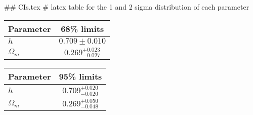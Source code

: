 ## CIs.tex
# latex table for the 1 and 2 sigma distribution of each parameter

\begin{tabular} { l  c}
 Parameter &  68\% limits\\
\hline
{\boldmath$h              $} & $0.709\pm 0.010            $\\
{\boldmath$\Omega_m       $} & $0.269^{+0.023}_{-0.027}   $\\
\hline
\end{tabular}

\begin{tabular} { l  c}
 Parameter &  95\% limits\\
\hline
{\boldmath$h              $} & $0.709^{+0.020}_{-0.020}   $\\
{\boldmath$\Omega_m       $} & $0.269^{+0.050}_{-0.048}   $\\
\hline
\end{tabular}
